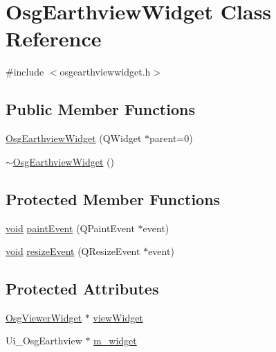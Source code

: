 \hypertarget{class_osg_earthview_widget}{\section{\-Osg\-Earthview\-Widget \-Class \-Reference}
\label{class_osg_earthview_widget}
}


{\ttfamily \#include $<$osgearthviewwidget.\-h$>$}

\subsection*{\-Public \-Member \-Functions}
\begin{DoxyCompactItemize}
\item 
\hyperlink{class_osg_earthview_widget_a6a67cd33434862cae536141fdcb5c06d}{\-Osg\-Earthview\-Widget} (\-Q\-Widget $\ast$parent=0)
\item 
\hyperlink{class_osg_earthview_widget_ad7f1b72afdc75d82601da60cdc833a59}{$\sim$\-Osg\-Earthview\-Widget} ()
\end{DoxyCompactItemize}
\subsection*{\-Protected \-Member \-Functions}
\begin{DoxyCompactItemize}
\item 
\hyperlink{group___u_a_v_objects_plugin_ga444cf2ff3f0ecbe028adce838d373f5c}{void} \hyperlink{class_osg_earthview_widget_a4f399854052930abec7f1b113c840d5b}{paint\-Event} (\-Q\-Paint\-Event $\ast$event)
\item 
\hyperlink{group___u_a_v_objects_plugin_ga444cf2ff3f0ecbe028adce838d373f5c}{void} \hyperlink{class_osg_earthview_widget_a2419e5469f3c595b7ab76fc225a63d6c}{resize\-Event} (\-Q\-Resize\-Event $\ast$event)
\end{DoxyCompactItemize}
\subsection*{\-Protected \-Attributes}
\begin{DoxyCompactItemize}
\item 
\hyperlink{class_osg_viewer_widget}{\-Osg\-Viewer\-Widget} $\ast$ \hyperlink{class_osg_earthview_widget_a2a1b22b5eafba67d10492824bdd9bdb8}{view\-Widget}
\item 
\-Ui\-\_\-\-Osg\-Earthview $\ast$ \hyperlink{class_osg_earthview_widget_ae0c3908fd9605c584166ab5e476995c1}{m\-\_\-widget}
\end{DoxyCompactItemize}


